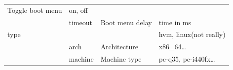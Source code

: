 \documentclass[
  14pt,
  english,
  a4paper,
]{scrreprt}
\begin{document}
\begin{longtable}[]{@{}llll@{}}
\begin{minipage}[t]{0.23\columnwidth}
Toggle boot menu\strut
\end{minipage} & \begin{minipage}[t]{0.31\columnwidth}\raggedright
on, off\strut
\end{minipage}\tabularnewline
\begin{minipage}[t]{0.16\columnwidth}\raggedright
\strut
\end{minipage} & \begin{minipage}[t]{0.15\columnwidth}\raggedright
timeout\strut
\end{minipage} & \begin{minipage}[t]{0.23\columnwidth}\raggedright
Boot menu delay\strut
\end{minipage} & \begin{minipage}[t]{0.31\columnwidth}\raggedright
time in ms\strut
\end{minipage}\tabularnewline
\begin{minipage}[t]{0.16\columnwidth}\raggedright
type\strut
\end{minipage} & \begin{minipage}[t]{0.15\columnwidth}\raggedright
\strut
\end{minipage} & \begin{minipage}[t]{0.23\columnwidth}\raggedright
\strut
\end{minipage} & \begin{minipage}[t]{0.31\columnwidth}\raggedright
hvm, linux(not really)\strut
\end{minipage}\tabularnewline
\begin{minipage}[t]{0.16\columnwidth}\raggedright
\strut
\end{minipage} & \begin{minipage}[t]{0.15\columnwidth}\raggedright
arch\strut
\end{minipage} & \begin{minipage}[t]{0.23\columnwidth}\raggedright
Architecture\strut
\end{minipage} & \begin{minipage}[t]{0.31\columnwidth}\raggedright
x86\_64\ldots{}\strut
\end{minipage}\tabularnewline
\begin{minipage}[t]{0.16\columnwidth}\raggedright
\strut
\end{minipage} & \begin{minipage}[t]{0.15\columnwidth}\raggedright
machine\strut
\end{minipage} & \begin{minipage}[t]{0.23\columnwidth}\raggedright
Machine type\strut
\end{minipage} & \begin{minipage}[t]{0.31\columnwidth}\raggedright
pc-q35, pc-i440fx\ldots{}\strut
\end{minipage}\tabularnewline
\bottomrule
\end{longtable}
\end{document}
